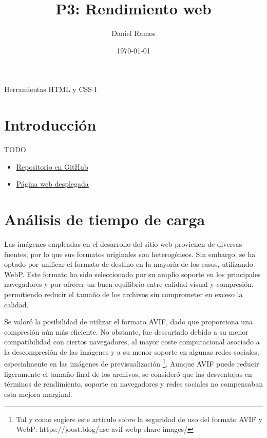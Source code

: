 \documentclass{article}
\title{P3: Rendimiento web}
\author{Daniel Ramos}
\date{\today}
\begin{document}
\maketitle

\begin{center}
    \large Herramientas HTML y CSS I
\end{center}

\newpage

\tableofcontents

\newpage

\section*{Introducción}

TODO

\begin{itemize}
    \item \href{https://github.com/DanielRamosAcosta/hhyc-dramosac}{Repositorio en GitHub}
    \item \href{https://www.danielramos.me/hhyc-dramosac}{Página web desplegada}
\end{itemize}

\newpage

\section{Análisis de tiempo de carga}\label{sec:analisis-de-tiempo-de-carga}

Las imágenes empleadas en el desarrollo del sitio web provienen de diversas fuentes, por lo que sus formatos originales son heterogéneos. Sin embargo, se ha optado por unificar el formato de destino en la mayoría de los casos, utilizando WebP. Este formato ha sido seleccionado por su amplio soporte en los principales navegadores y por ofrecer un buen equilibrio entre calidad visual y compresión, permitiendo reducir el tamaño de los archivos sin comprometer en exceso la calidad.

Se valoró la posibilidad de utilizar el formato AVIF, dado que proporciona una compresión aún más eficiente. No obstante, fue descartado debido a su menor compatibilidad con ciertos navegadores, al mayor coste computacional asociado a la descompresión de las imágenes y a su menor soporte en algunas redes sociales, especialmente en las imágenes de previsualización \footnote{Tal y como sugiere este artículo sobre la seguridad de uso del formato AVIF y WebP: https://joost.blog/use-avif-webp-share-images/}. Aunque AVIF puede reducir ligeramente el tamaño final de los archivos, se consideró que las desventajas en términos de rendimiento, soporte en navegadores y redes sociales no compensaban esta mejora marginal.
\end{document}

